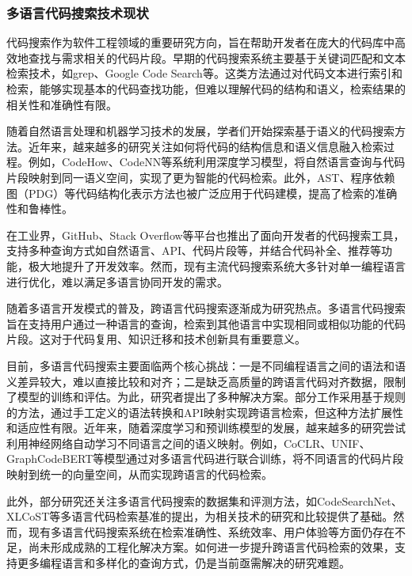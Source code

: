 \documentclass[UTF8,a4paper,12pt]{ctexart}
\numberwithin{equation}{section}
\begin{document}
\subsubsection{多语言代码搜索技术现状}
代码搜索作为软件工程领域的重要研究方向，旨在帮助开发者在庞大的代码库中高效地查找与需求相关的代码片段。早期的代码搜索系统主要基于关键词匹配和文本检索技术，如grep、Google Code Search等。这类方法通过对代码文本进行索引和检索，能够实现基本的代码查找功能，但难以理解代码的结构和语义，检索结果的相关性和准确性有限。\par
随着自然语言处理和机器学习技术的发展，学者们开始探索基于语义的代码搜索方法。近年来，越来越多的研究关注如何将代码的结构信息和语义信息融入检索过程。例如，CodeHow、CodeNN等系统利用深度学习模型，将自然语言查询与代码片段映射到同一语义空间，实现了更为智能的代码检索。此外，AST、程序依赖图（PDG）等代码结构化表示方法也被广泛应用于代码建模，提高了检索的准确性和鲁棒性。\par
在工业界，GitHub、Stack Overflow等平台也推出了面向开发者的代码搜索工具，支持多种查询方式如自然语言、API、代码片段等，并结合代码补全、推荐等功能，极大地提升了开发效率。然而，现有主流代码搜索系统大多针对单一编程语言进行优化，难以满足多语言协同开发的需求。\par
随着多语言开发模式的普及，跨语言代码搜索逐渐成为研究热点。多语言代码搜索旨在支持用户通过一种语言的查询，检索到其他语言中实现相同或相似功能的代码片段。这对于代码复用、知识迁移和技术创新具有重要意义。\par
目前，多语言代码搜索主要面临两个核心挑战：一是不同编程语言之间的语法和语义差异较大，难以直接比较和对齐；二是缺乏高质量的跨语言代码对齐数据，限制了模型的训练和评估。为此，研究者提出了多种解决方案。部分工作采用基于规则的方法，通过手工定义的语法转换和API映射实现跨语言检索，但这种方法扩展性和适应性有限。近年来，随着深度学习和预训练模型的发展，越来越多的研究尝试利用神经网络自动学习不同语言之间的语义映射。例如，CoCLR、UNIF、GraphCodeBERT等模型通过对多语言代码进行联合训练，将不同语言的代码片段映射到统一的向量空间，从而实现跨语言的代码检索。\par
此外，部分研究还关注多语言代码搜索的数据集和评测方法，如CodeSearchNet、XLCoST等多语言代码检索基准的提出，为相关技术的研究和比较提供了基础。然而，现有多语言代码搜索系统在检索准确性、系统效率、用户体验等方面仍存在不足，尚未形成成熟的工程化解决方案。如何进一步提升跨语言代码检索的效果，支持更多编程语言和多样化的查询方式，仍是当前亟需解决的研究难题。
\end{document}
